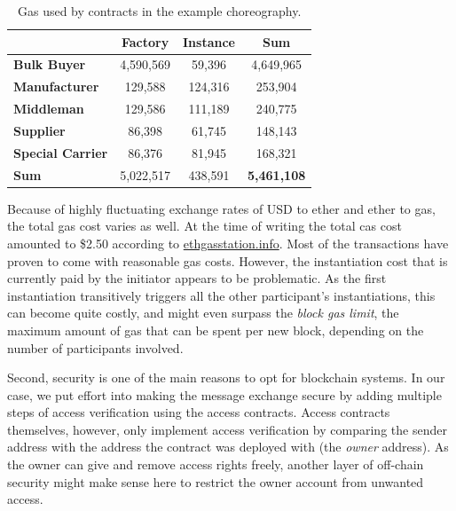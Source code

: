 \documentclass[runningheads]{llncs}
\begin{document}
\begin{table}
	\centering
	\caption{Gas used by contracts in the example choreography.} \label{gasusage}
	\begin{tabular}{|l | c | c | c|}
		\hline                          & \textbf{Factory} & \textbf{Instance} & \textbf{Sum}       \\
		\hline \textbf{Bulk Buyer}      & 4,590,569        & 59,396            & 4,649,965          \\
		\hline \textbf{Manufacturer}    & 129,588          & 124,316           & 253,904            \\
		\hline \textbf{Middleman}       & 129,586          & 111,189           & 240,775            \\
		\hline \textbf{Supplier}        & 86,398           & 61,745            & 148,143            \\
		\hline \textbf{Special Carrier} & 86,376           & 81,945            & 168,321            \\
		\hline \textbf{Sum}             & 5,022,517        & 438,591           & \textbf{5,461,108} \\ \hline
	\end{tabular}
\end{table}
Because of highly fluctuating exchange rates of USD to ether and ether to gas, the total gas cost varies as well. At the time of writing the total cas cost amounted to \$2.50 according to \url{ethgasstation.info}. 
Most of the transactions have proven to come with reasonable gas costs.
However, the instantiation cost that is currently paid by the initiator appears to be problematic.
As the first instantiation transitively triggers all the other participant's instantiations, this can become quite costly, and might even surpass the \emph{block gas limit}, the maximum amount of gas that can be spent per new block, depending on the number of participants involved.

Second, security is one of the main reasons to opt for blockchain systems.
In our case, we put effort into making the message exchange secure by adding multiple steps of access verification using the access contracts.
Access contracts themselves, however, only implement access verification by comparing the sender address with the address the contract was deployed with (the \emph{owner} address).
As the owner can give and remove access rights freely, another layer of off-chain security might make sense here to restrict the owner account from unwanted access.
\end{document}
